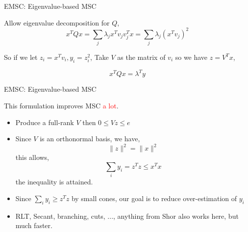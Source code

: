 


\begin{frame}{EMSC: Eigenvalue-based MSC}

  Allow eigenvalue decomposition for \(Q\),
  \[x^TQx = \sum_j \lambda_j x^Tv_jv_j^Tx = \sum_j \lambda_j (x^Tv_j)^2\]

  So if we let \(z_i = x^Tv_i, y_i = z_i^2\), Take \(V\) as the matrix of \(v_i\) so we have \(z = V^Tx\),

  \[x^TQx = \lambda^Ty\]
\end{frame}

\begin{frame}{EMSC: Eigenvalue-based MSC}

  This formulation improves MSC \textcolor{red}{a lot}.
  \begin{itemize}

    \item Produce a full-rank \(V\) then \(0 \le Vz \le e \)
    \item Since \(V\) is an orthonormal basis, we have,
          \[\|z\|^2 = \|x\|^2\]
          this allows,
          \[\sum_i y_i = z^Tz \le x^Tx\]
          the inequality is attained.
    \item Since \(\sum_i y_i \ge z^Tz\) by small cones, our goal is to reduce over-estimation of \(y_i\)
    \item RLT, Secant, branching, cuts, ..., anything from Shor also works here, but much faster.
  \end{itemize}
\end{frame}

